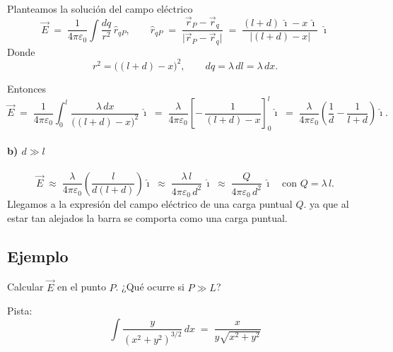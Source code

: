 \documentclass[a4paper,12pt]{article}
\begin{document}
Planteamos la solución del campo eléctrico
\[
\vec E \;=\; \frac{1}{4\pi\varepsilon_0}\int \frac{dq}{r^2}\,\hat r_{qP},
\qquad
\hat r_{qP} \;=\; \frac{\vec r_P-\vec r_q}{\lvert \vec r_P-\vec r_q\rvert}
\;=\; \frac{(l+d)\,\hat{\imath}-x\,\hat{\imath}}{\lvert (l+d)-x\rvert}
\; \hat{\imath}
\]
Donde
\[
r^2 = \bigl((l+d)-x\bigr)^2,
\qquad
dq = \lambda\,dl = \lambda\,dx.
\]

Entonces
\[
\vec E \;=\; \frac{1}{4\pi\varepsilon_0}\int_{0}^{l}
\frac{\lambda\,dx}{\bigl((l+d)-x\bigr)^2}\,\hat{\imath}
\;=\;
\frac{\lambda}{4\pi\varepsilon_0}\left[ -\,\frac{1}{(l+d)-x} \right]_{0}^{l}\hat{\imath}
\;=\;
\frac{\lambda}{4\pi\varepsilon_0}\!\left(\frac{1}{d}-\frac{1}{l+d}\right)\hat{\imath}.
\]

\paragraph*{b) $d\gg l$}
\[
\vec E \;\approx\; \frac{\lambda}{4\pi\varepsilon_0}\left(\frac{l}{d(l+d)}\right)\hat{\imath}
\;\approx\; \frac{\lambda\,l}{4\pi\varepsilon_0\,d^{2}}\,\hat{\imath}
\;\approx\; \frac{Q}{4\pi\varepsilon_0\,d^{2}}\,\hat{\imath}
\quad\text{con } Q=\lambda\,l.
\]
Llegamos a la expresión del campo eléctrico de una carga puntual $Q$. ya que al estar tan alejados la barra se comporta como una carga puntual.

\newpage

\subsection*{Ejemplo}

Calcular $\vec E$ en el punto $P$.  
¿Qué ocurre si $P \gg L$?

\begin{center}
\end{center}

\noindent Pista: 
\[
\int \frac{y}{(x^2+y^2)^{3/2}}\,dx \;=\; \frac{x}{y\sqrt{x^2+y^2}}
\]
\end{document}
